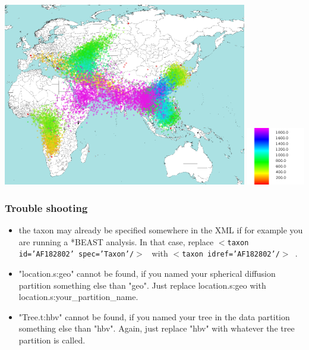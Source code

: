 \documentclass{article}
\begin{document}
\includegraphics[width=0.8\textwidth]{figures/heatmap}
\includegraphics[width=0.19\textwidth]{figures/legend}


\subsubsection*{Trouble shooting}
\begin{itemize}
\item the taxon may already be specified somewhere in the XML if for example you are running a *BEAST analysis. In that case, replace {\tt $<$taxon id='AF182802' spec='Taxon'/$>$ } with {\tt$<$taxon idref='AF182802'/$>$ }.
\item "location.s:geo" cannot be found, if you named your spherical diffusion partition something else than "geo". Just replace location.s:geo with location.s:your\_partition\_name.
\item "Tree.t:hbv" cannot be found, if you named your tree in the data partition something else than "hbv". Again, just replace "hbv" with whatever the tree partition is called.
\end{itemize}




\end{document}
